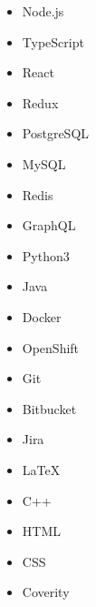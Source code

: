 

\begin{multicols}{5}
	\begin{itemize}
		\item Node.js
		\item TypeScript
		\item React
		\item Redux
		\item PostgreSQL
		\item MySQL
		\item Redis
		\item GraphQL
		\item Python3
		\item Java
		\item Docker
		\item OpenShift
		\item Git
		\item Bitbucket
		\item Jira
		\item LaTeX
		\item C++
		\item HTML
		\item CSS
		\item Coverity
	\end{itemize}
\end{multicols}
